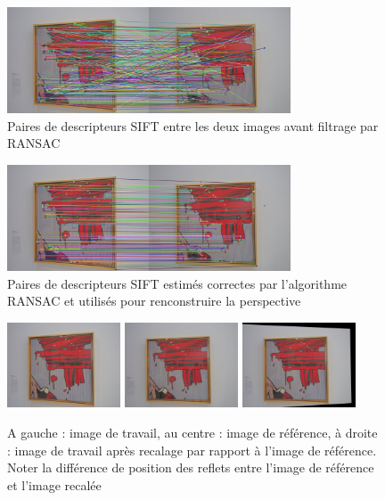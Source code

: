 \documentclass[12pt,a4paper]{article}
\begin{document}
\begin{figure}[H]
  \centering
  \includegraphics[width=0.75\textwidth]{Fig/sift_raw.png}
  \caption{Paires de descripteurs SIFT entre les deux images avant filtrage par RANSAC}
\end{figure}

\begin{figure}[H]
  \centering
  \includegraphics[width=0.75\textwidth]{Fig/sift_ransac.png}
  \caption{Paires de descripteurs SIFT estimés correctes par l'algorithme RANSAC et utilisés pour renconstruire la perspective}
\end{figure}

\begin{figure}[H]
  \centering
  \includegraphics[width=0.30\textwidth]{Fig/working.png}
  \includegraphics[width=0.30\textwidth]{Fig/reference_image.png}
  \includegraphics[width=0.30\textwidth]{Fig/fitted.png}

  \caption{A gauche : image de travail, au centre : image de référence, à droite : image de travail après recalage par rapport à l'image de référence. Noter la différence de position des reflets entre l'image de référence et l'image recalée}
\end{figure}
\end{document}
